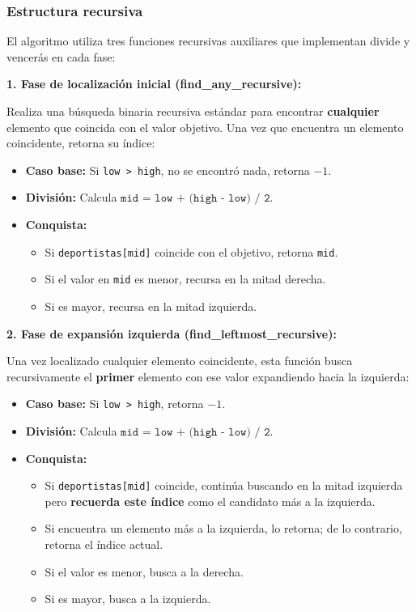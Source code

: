\subsubsection{Estructura recursiva}

El algoritmo utiliza tres funciones recursivas auxiliares que implementan divide y vencerás en cada fase:

\textbf{1. Fase de localización inicial (find\_any\_recursive):}

Realiza una búsqueda binaria recursiva estándar para encontrar \textbf{cualquier} elemento que coincida con el valor objetivo. Una vez que encuentra un elemento coincidente, retorna su índice:

\begin{itemize}
    \item \textbf{Caso base:} Si \texttt{low > high}, no se encontró nada, retorna $-1$.
    \item \textbf{División:} Calcula \(\texttt{mid = low + (high - low) / 2}\).
    \item \textbf{Conquista:} 
    \begin{itemize}
        \item Si \texttt{deportistas[mid]} coincide con el objetivo, retorna \texttt{mid}.
        \item Si el valor en \texttt{mid} es menor, recursa en la mitad derecha.
        \item Si es mayor, recursa en la mitad izquierda.
    \end{itemize}
\end{itemize}

\textbf{2. Fase de expansión izquierda (find\_leftmost\_recursive):}

Una vez localizado cualquier elemento coincidente, esta función busca recursivamente el \textbf{primer} elemento con ese valor expandiendo hacia la izquierda:

\begin{itemize}
    \item \textbf{Caso base:} Si \texttt{low > high}, retorna $-1$.
    \item \textbf{División:} Calcula \(\texttt{mid = low + (high - low) / 2}\).
    \item \textbf{Conquista:} 
    \begin{itemize}
        \item Si \texttt{deportistas[mid]} coincide, continúa buscando en la mitad izquierda pero \textbf{recuerda este índice} como el candidato más a la izquierda.
        \item Si encuentra un elemento más a la izquierda, lo retorna; de lo contrario, retorna el índice actual.
        \item Si el valor es menor, busca a la derecha.
        \item Si es mayor, busca a la izquierda.
    \end{itemize}
\end{itemize}

